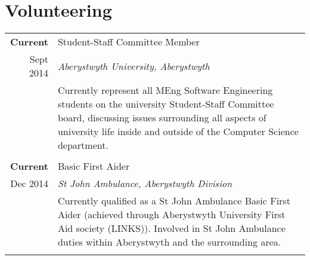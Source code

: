 \documentclass[a4paper, 10pt]{extarticle} %
\begin{document}
\section{Volunteering}

\begin{tabular}{r | p{13cm}}	

\textbf{Current}
		
		 & 
		 
		 Student-Staff Committee Member  \\
		 
			Sept 2014
		 
		& 
		 
		\textit{Aberystwyth University, Aberystwyth} \\ 
		
& 

\footnotesize{

Currently represent all MEng Software Engineering students on the university Student-Staff Committee board, discussing issues surrounding all aspects of university life inside and outside of the Computer Science department. 

\vspace{-0.4cm}

} \vspace{-0.4cm} \\

\multicolumn{2}{c}{} \\

\textbf{Current}
		
		 & 
		 
		 Basic First Aider  \\
		 
			Dec 2014
		 
		& 
		 
		\textit{St John Ambulance, Aberystwyth Division} \\ 
		
& 

\footnotesize{

Currently qualified as a St John Ambulance Basic First Aider (achieved through Aberystwyth University First Aid society (LINKS)). Involved in St John Ambulance duties within Aberystwyth and the surrounding area. 

\vspace{-0.4cm}

} \vspace{-0.4cm} \\

\multicolumn{2}{c}{} \\


\end{tabular}
\end{document}
